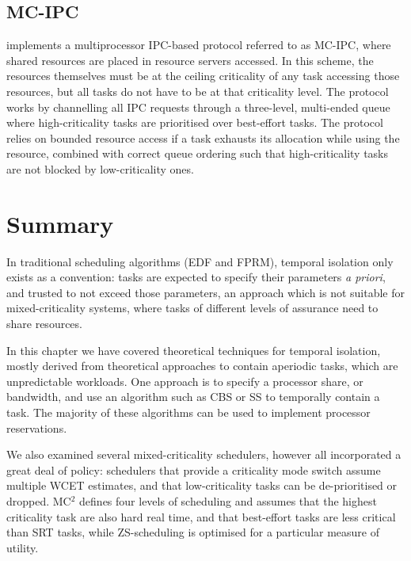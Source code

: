 \subsection{MC-IPC}
\label{sec:sched-mc-ipc}

\citet{Brandenburg_14} implements a multiprocessor \gls{IPC}-based protocol referred to as MC-IPC,
where shared resources are placed in resource servers accessed. In this scheme, the resources
themselves must be at the ceiling criticality of any task accessing those resources,
but all tasks do not have to be at that criticality level.
The protocol works by channelling all IPC requests through a three-level, multi-ended queue
where high-criticality tasks are prioritised over best-effort tasks. The protocol relies on bounded
resource access if a task exhausts its allocation while using the resource, combined with correct
queue ordering such that high-criticality tasks are not blocked by low-criticality ones. 

\section{Summary}

In traditional scheduling algorithms (\gls{EDF} and \gls{FPRM}), temporal isolation only exists as a
convention: tasks are expected to specify their parameters \emph{a priori}, and trusted to not
exceed those parameters, an approach which is not suitable for mixed-criticality systems, where
tasks of different levels of assurance need to share resources.

In this chapter we have covered theoretical techniques for temporal isolation, mostly derived from 
theoretical approaches to contain aperiodic tasks, which are unpredictable workloads. One approach
is to specify a processor share, or bandwidth, and use an algorithm such as \gls{CBS} or \gls{SS} to 
temporally contain a task. The majority of these algorithms can be used to implement processor
reservations.

We also examined several mixed-criticality schedulers, however all incorporated a great deal of
policy: schedulers that provide a criticality mode switch assume multiple \gls{WCET} estimates, and
that low-criticality tasks can be de-prioritised or dropped. MC$^2$ defines four levels of
scheduling and assumes that the highest criticality task are also hard real time, and that
best-effort tasks are less critical than \gls{SRT} tasks, while \gls{ZS}-scheduling is optimised for
a particular measure of utility. 

